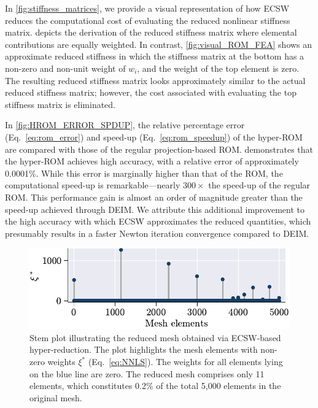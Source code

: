 \documentclass[11pt]{article}
\begin{document}
        In \cref{fig:stiffness_matrices}, we provide a visual representation of how ECSW reduces the computational cost of evaluating the reduced nonlinear stiffness matrix.
         depicts the derivation of the reduced stiffness matrix where elemental contributions are equally weighted.
        In contrast, \cref{fig:visual_ROM_FEA} shows an approximate reduced stiffness in which the stiffness matrix at the bottom has a non-zero and non-unit weight of $w_i$, and the weight of the top element is zero.
        The resulting reduced stiffness matrix looks approximately similar to the actual reduced stiffness matrix; however, the cost associated with evaluating the top stiffness matrix is eliminated.



        In \cref{fig:HROM_ERROR_SPDUP}, the relative percentage error (Eq.~\ref{eq:rom_error}) and speed-up (Eq.~\ref{eq:rom_speedup}) of the hyper-ROM are compared with those of the regular projection-based ROM.
         demonstrates that the hyper-ROM achieves high accuracy, with a relative error of approximately 0.0001\%.
        While this error is marginally higher than that of the ROM, the computational speed-up is remarkable—nearly $300\times$ the speed-up of the regular ROM.
        This performance gain is almost an order of magnitude greater than the speed-up achieved through DEIM.
        We attribute this additional improvement to the high accuracy with which ECSW approximates the reduced quantities, which presumably results in a  faster Newton iteration convergence compared to DEIM.


        \begin{figure}[t]
                \centering
                \includegraphics[width=0.8\linewidth]{reduced_mesh_ECSW_new.pdf}
                \caption{Stem plot illustrating the reduced mesh obtained via ECSW-based hyper-reduction. The plot highlights the mesh elements with non-zero weights $\xi^*$ (Eq.~\ref{eq:NNLS}). The weights for all elements lying on the blue line are zero. The reduced mesh comprises only 11 elements, which constitutes 0.2\% of the total 5,000 elements in the original mesh.}
                \label{fig:reduced_mesh_ecsw}
        \end{figure}
\end{document}
